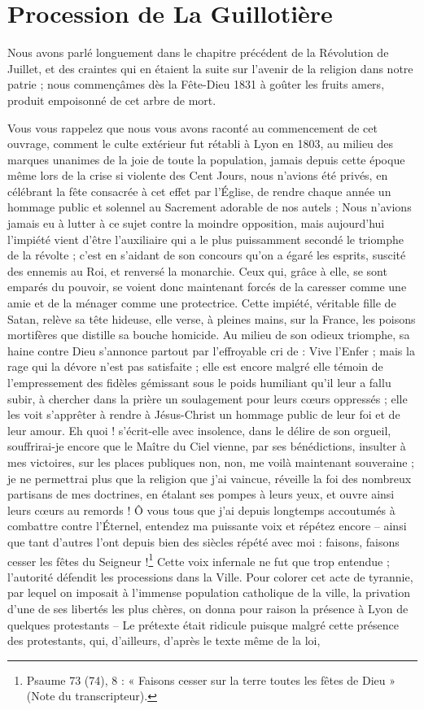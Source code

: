 \documentclass[11pt,a4paper]{report}
\begin{document}
\section*{Procession de La Guillotière}

Nous avons parlé longuement dans le chapitre précédent de la Révolution de Juillet, et des craintes qui en étaient la suite sur l'avenir de la religion dans notre patrie ; nous commençâmes dès la Fête-Dieu 1831 à goûter les fruits amers, produit empoisonné de cet arbre de mort.

Vous vous rappelez que nous vous avons raconté au commencement de cet ouvrage, comment le culte extérieur fut rétabli à Lyon en 1803, au milieu des marques unanimes de la joie de toute la population, jamais depuis cette époque même lors de la crise si violente des Cent Jours, nous n'avions été privés, en célébrant la fête consacrée à cet effet par l'Église, de rendre chaque année un hommage public et solennel au Sacrement adorable de nos autels ; Nous n'avions jamais eu à lutter à ce sujet contre la moindre opposition, mais aujourd'hui l'impiété vient d'être l'auxiliaire qui a le plus puissamment secondé le triomphe de la révolte ; c'est en s'aidant de son concours qu'on a égaré les esprits, suscité des ennemis au Roi, et renversé la monarchie. Ceux qui, grâce à elle, se sont emparés du pouvoir, se voient donc maintenant forcés de la caresser comme une amie et de la ménager comme une protectrice. Cette impiété, véritable fille de Satan, relève sa tête hideuse, elle verse, à pleines mains, sur la France, les poisons mortifères que distille sa bouche homicide. Au milieu de son odieux triomphe, sa haine contre Dieu s'annonce partout par l'effroyable cri de : Vive l'Enfer ; mais la rage qui la dévore n'est pas satisfaite ; elle est encore malgré elle témoin de l'empressement des fidèles gémissant sous le poids humiliant qu'il leur a fallu subir, à chercher dans la prière un soulagement pour leurs cœurs oppressés ; elle les voit s'apprêter à rendre à Jésus-Christ un hommage public de leur foi et de leur amour. Eh quoi ! s'écrit-elle avec insolence, dans le délire de son orgueil, souffrirai-je encore que le Maître du Ciel vienne, par ses bénédictions, insulter à mes victoires, sur les places publiques non, non, me voilà maintenant souveraine ; je ne permettrai plus que la religion que j'ai vaincue, réveille la foi des nombreux partisans de mes doctrines, en étalant ses pompes à leurs yeux, et ouvre ainsi leurs cœurs au remords ! Ô vous tous que j'ai depuis longtemps accoutumés à combattre contre l'Éternel, entendez ma puissante voix et répétez encore -- ainsi que tant d'autres l'ont depuis bien des siècles répété avec moi : faisons, faisons cesser les fêtes du Seigneur !\footnote{Psaume 73 (74), 8 : « Faisons cesser sur la terre toutes les fêtes de Dieu » (Note du transcripteur).} Cette voix infernale ne fut que trop entendue ; l'autorité défendit les processions dans la Ville. Pour colorer cet acte de tyrannie, par lequel on imposait à l'immense population catholique de la ville, la privation d'une de ses libertés les plus chères, on donna pour raison la présence à Lyon de quelques protestants -- Le prétexte était ridicule puisque malgré cette présence des protestants, qui, d'ailleurs, d'après le texte même de la loi, 
\end{document}
